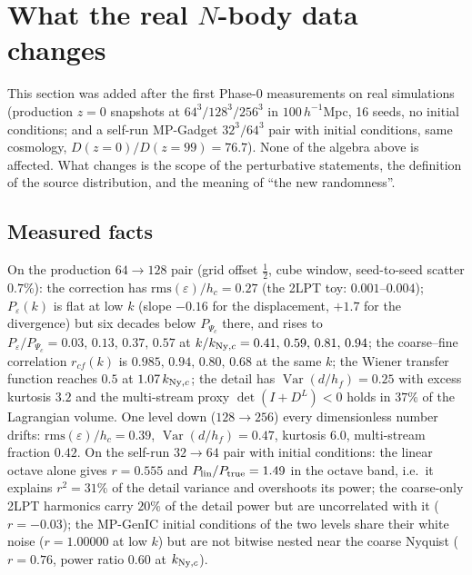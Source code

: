 \documentclass[11pt]{article}
\theoremstyle{definition}
\newcommand{\Var}{\operatorname{Var}}
\newcommand{\Ny}{{\rm Ny}}
\begin{document}
\section{What the real $N$-body data changes}\label{sec:real}

This section was added after the first Phase-0 measurements on real simulations (production $z=0$ snapshots at $64^3/128^3/256^3$ in $100\,h^{-1}$Mpc, 16 seeds, no initial conditions; and a self-run MP-Gadget $32^3/64^3$ pair with initial conditions, same cosmology, $D(z{=}0)/D(z{=}99)=76.7$). None of the algebra above is affected. What changes is the scope of the perturbative statements, the definition of the source distribution, and the meaning of ``the new randomness''.

\subsection{Measured facts}

On the production $64\to128$ pair (grid offset $\tfrac12$, cube window, seed-to-seed scatter $0.7\%$): the correction has $\mathrm{rms}(\varepsilon)/h_c=0.27$ (the 2LPT toy: $0.001$--$0.004$); $P_\varepsilon(k)$ is flat at low $k$ (slope $-0.16$ for the displacement, $+1.7$ for the divergence) but six decades below $P_{\Psi_c}$ there, and rises to $P_\varepsilon/P_{\Psi_c}=0.03,\,0.13,\,0.37,\,0.57$ at $k/k_{\Ny,c}=0.41,\,0.59,\,0.81,\,0.94$; the coarse--fine correlation $r_{cf}(k)$ is $0.985,\,0.94,\,0.80,\,0.68$ at the same $k$; the Wiener transfer function reaches $0.5$ at $1.07\,k_{\Ny,c}$; the detail has $\Var(d/h_f)=0.25$ with excess kurtosis $3.2$ and the multi-stream proxy $\det(I+D^{L})<0$ holds in $37\%$ of the Lagrangian volume. One level down ($128\to256$) every dimensionless number drifts: $\mathrm{rms}(\varepsilon)/h_c=0.39$, $\Var(d/h_f)=0.47$, kurtosis $6.0$, multi-stream fraction $0.42$. On the self-run $32\to64$ pair with initial conditions: the linear octave alone gives $r=0.555$ and $P_{\rm lin}/P_{\rm true}=1.49$ in the octave band, i.e.\ it explains $r^2=31\%$ of the detail variance and overshoots its power; the coarse-only 2LPT harmonics carry $20\%$ of the detail power but are uncorrelated with it ($r=-0.03$); the MP-GenIC initial conditions of the two levels share their white noise ($r=1.00000$ at low $k$) but are not bitwise nested near the coarse Nyquist ($r=0.76$, power ratio $0.60$ at $k_{\Ny,c}$).
\end{document}
